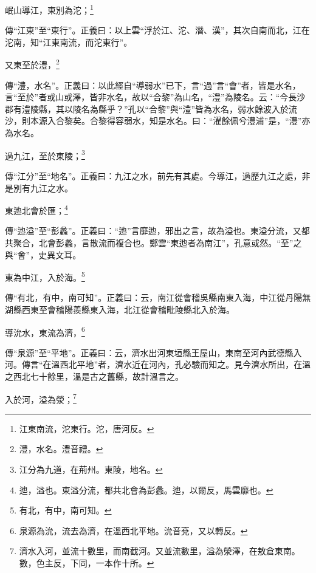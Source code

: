 岷山導江，東別為沱；\footnote{江東南流，沱東行。沱，唐河反。}

{\noindent\zhuan{}\fzbyks 傳“江東”至“東行”。正義曰：以上雲“浮於江、沱、潛、漢”，其次自南而北，江在沱南，知“江東南流，而沱東行”。 \par}

又東至於澧，\footnote{澧，水名。澧音禮。}

{\noindent\zhuan{}\fzbyks 傳“澧，水名”。正義曰：以此經自“導弱水”已下，言“過”言“會”者，皆是水名，言“至於”者或山或澤，皆非水名，故以“合黎”為山名，“澧”為陵名。云：“今長沙郡有澧陵縣，其以陵名為縣乎？”孔以“合黎”與“澧”皆為水名，弱水餘波入於流沙，則本源入合黎矣。合黎得容弱水，知是水名。曰：“濯餘佩兮澧浦”是，“澧”亦為水名。 \par}

過九江，至於東陵；\footnote{江分為九道，在荊州。東陵，地名。}

{\noindent\zhuan{}\fzbyks 傳“江分”至“地名”。正義曰：九江之水，前先有其處。今導江，過歷九江之處，非是別有九江之水。 \par}

東迆北會於匯；\footnote{迆，溢也。東溢分流，都共北會為彭蠡。迆，以爾反，馬雲靡也。}

{\noindent\zhuan{}\fzbyks 傳“迆溢”至“彭蠡”。正義曰：“迆”言靡迆，邪出之言，故為溢也。東溢分流，又都共聚合，北會彭蠡，言散流而複合也。鄭雲“東迆者為南江”，孔意或然。“至”之與“會”，史異文耳。 \par}

東為中江，入於海。\footnote{有北，有中，南可知。}

{\noindent\zhuan{}\fzbyks 傳“有北，有中，南可知”。正義曰：云，南江從會稽吳縣南東入海，中江從丹陽無湖縣西東至會稽陽羨縣東入海，北江從會稽毗陵縣北入於海。 \par}

導沇水，東流為濟，\footnote{泉源為沇，流去為濟，在溫西北平地。沇音兗，又以轉反。}

{\noindent\zhuan{}\fzbyks 傳“泉源”至“平地”。正義曰：云，濟水出河東垣縣王屋山，東南至河內武德縣入河。傳言“在溫西北平地”者，濟水近在河內，孔必驗而知之。見今濟水所出，在溫之西北七十餘里，溫是古之舊縣，故計溫言之。 \par}

入於河，溢為滎；\footnote{濟水入河，並流十數里，而南截河。又並流數里，溢為滎澤，在敖倉東南。數，色主反，下同，一本作十所。}

